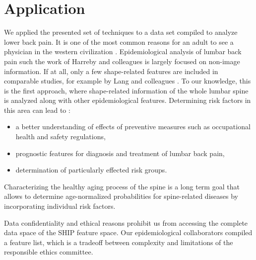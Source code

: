 \documentclass[journal]{style/vgtc} 			          %
\begin{document}
\section{Application}
We applied the presented set of techniques to a data set compiled to analyze lower back pain. 
%
It is one of the most common reasons for an adult to see a physician in the western civilization \cite{Backpain}.
%
Epidemiological analysis of lumbar back pain such the work of Harreby and colleagues \cite{Harreby1996} is largely focused on non-image information.
%
If at all, only a few shape-related features are included in comparable studies, for example by Lang and colleagues \cite{Lang2011}.
%
To our knowledge, this is the first approach, where shape-related information of the whole lumbar spine is analyzed along with other epidemiological features.
%
Determining risk factors in this area can lead to \cite{Fletcher2012}:
\begin{itemize}
	\item a better understanding of effects of preventive measures such as occupational health and safety regulations,
	\item prognostic features for diagnosis and treatment of lumbar back pain,
	\item determination of particularly effected risk groups.
\end{itemize}
%
Characterizing the healthy aging process of the spine is a long term goal that allows to determine age-normalized probabilities for spine-related diseases by incorporating individual risk factors.

Data confidentiality and ethical reasons prohibit us from accessing the complete data space of the SHIP feature space.
%
Our epidemiological collaborators compiled a feature list, which is a tradeoff between complexity and limitations of the responsible ethics committee.
%
%
\end{document}
